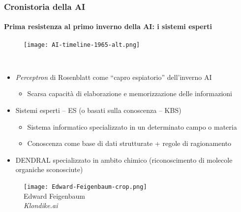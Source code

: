 \begin{frame}[t,fragile] \frametitle{Cronistoria della AI}
{\scriptsize
{}
\framesubtitle{Prima resistenza al primo inverno della AI: i sistemi esperti}
\vspace*{-.5cm}
	\begin{minipage}[t]{\textwidth}
		\begin{figure}[ht]
			\centering
			\texttt{[image: AI-timeline-1965-alt.png]}
		\end{figure}
	\end{minipage}
	\\\vspace*{.3cm}
	\begin{minipage}[t]{\textwidth}
		\begin{minipage}[t]{0.6\textwidth}
			\begin{itemize}[leftmargin=10pt,align=right]
				\onslide<2->\item[\alert{\faArrowCircleRight}] \emph{Perceptron} di Rosenblatt come ``capro espiatorio'' dell'inverno AI
				\begin{itemize}[leftmargin=10pt,align=right]
					\item[\alert{\faArrowCircleRight}] Scarsa capacità di \alert{elaborazione} e \alert{memorizzazione} delle informazioni
				\end{itemize}
				\item[\alert{\faArrowCircleRight}] \alert{Sistemi esperti} -- ES (o \alert{basati sulla conoscenza} -- KBS)
				\begin{itemize}[leftmargin=10pt,align=right]
					\item[\alert{\faArrowCircleRight}] Sistema informatico specializzato in un determinato campo o materia
					\item[\alert{\faArrowCircleRight}] Conoscenza come base di dati strutturate + regole di ragionamento
				\end{itemize}
				\item[\alert{\faArrowCircleRight}] DENDRAL specializzato in ambito \alert{chimico} (riconoscimento di molecole organiche sconosciute)
			\end{itemize}
		\end{minipage}
		\begin{minipage}[t]{0.4\textwidth}
			\centering
			\begin{figure}[ht]
				\texttt{[image: Edward-Feigenbaum-crop.png]}
				{\tiny\\Edward Feigenbaum\\\textit{\textcopyright Klondike.ai}}
			\end{figure}
		\end{minipage}
	\end{minipage}
}
\end{frame}
